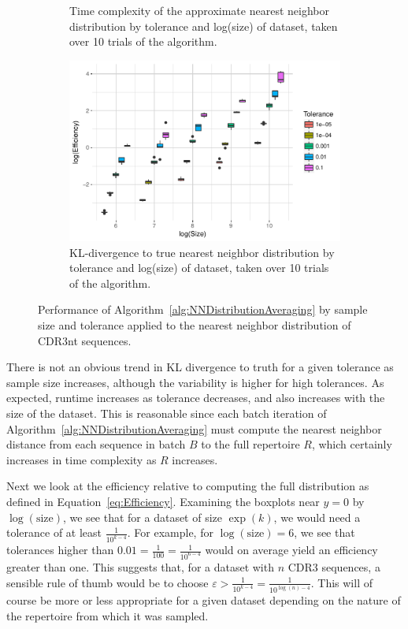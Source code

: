 \documentclass{article}
\begin{document}
\begin{figure}
\begin{subfigure}{0.5\textwidth}
    	\caption{Time complexity of the approximate nearest neighbor distribution by tolerance and log(size) of dataset, taken over 10 trials of the algorithm.}
    	\label{fig:NNTimeBySizeCDR3}
    \end{subfigure}
    \begin{subfigure}{0.5\textwidth}
        \includegraphics[width=\linewidth]{Figures/NearestNeighbor/CDR3/efficiency_by_size_and_tol.pdf}
    	\caption{KL-divergence to true nearest neighbor distribution by tolerance and log(size) of dataset, taken over 10 trials of the algorithm.}
    	\label{fig:NNEfficiencyBySizeCDR3}
    \end{subfigure}
    \caption{Performance of Algorithm~\ref{alg:NNDistributionAveraging} by sample size and tolerance applied to the nearest neighbor distribution of CDR3nt sequences.}
\end{figure}
There is not an obvious trend in KL divergence to truth for a given tolerance as sample size increases, although the variability is higher for high tolerances.
As expected, runtime increases as tolerance decreases, and also increases with the size of the dataset.
This is reasonable since each batch iteration of Algorithm~\ref{alg:NNDistributionAveraging} must compute the nearest neighbor distance from each sequence in batch $B$ to the full repertoire $R$, which certainly increases in time complexity as $R$ increases.

Next we look at the efficiency relative to computing the full distribution as defined in Equation~\ref{eq:Efficiency}.
Examining the boxplots near $y = 0$ by $\log(\text{size})$, we see that for a dataset of size $\exp(k)$, we would need a tolerance of at least $\frac{1}{10^{k - 4}}$.
For example, for $\log(\text{size}) = 6$, we see that tolerances higher than $0.01 = \frac{1}{100} = \frac{1}{10^{6 - 4}}$ would on average yield an efficiency greater than one.
This suggests that, for a dataset with $n$ CDR3 sequences, a sensible rule of thumb would be to choose $\varepsilon > \frac{1}{10^{k - 4}} = \frac{1}{10^{\log(n) - 4}}$.
This will of course be more or less appropriate for a given dataset depending on the nature of the repertoire from which it was sampled.
\end{document}
